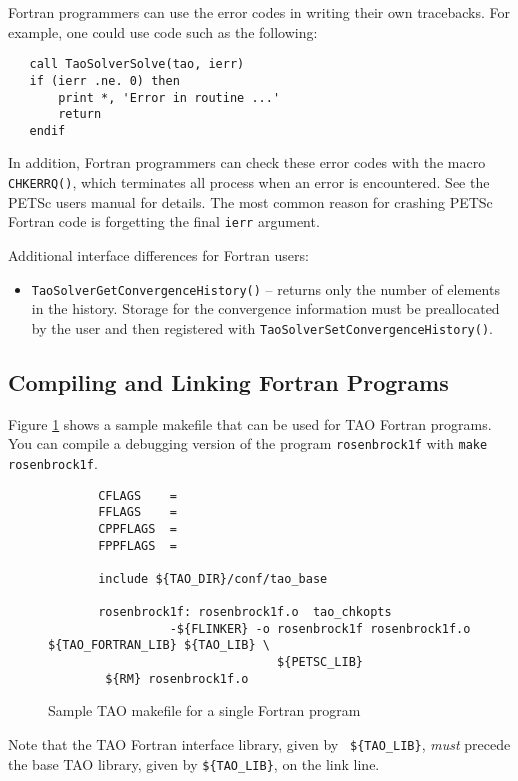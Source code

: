 Fortran programmers can use the error codes in writing their own
tracebacks.  For example, one could use code such as the following:
\begin{verbatim}
   call TaoSolverSolve(tao, ierr)
   if (ierr .ne. 0) then
       print *, 'Error in routine ...'
       return
   endif
\end{verbatim}
\noindent
In addition, Fortran programmers can check these error codes with the
macro {\tt CHKERRQ()}, which terminates all process when an error
is encountered.  See the PETSc users manual for details.  The most
common reason for crashing PETSc Fortran code is forgetting the final
{\tt ierr} argument.

Additional interface differences for Fortran users:
\begin{itemize}
\item \texttt{TaoSolverGetConvergenceHistory()} -- returns only the number of 
elements in the history.  Storage for the convergence information must 
be preallocated by the user and then registered with 
\texttt{TaoSolverSetConvergenceHistory()}.
\end{itemize}

\subsection{Compiling and Linking Fortran Programs}
\label{sec:fortcompile}

Figure \ref{fig:make4} shows a sample makefile that can be used for
TAO Fortran programs.  You can compile a debugging
version of the program {\tt rosenbrock1f} with 
{\tt make rosenbrock1f}.

\begin{figure}[tbh]
{\footnotesize
\begin{verbatim}   
       CFLAGS    = 
       FFLAGS    = 
       CPPFLAGS  =
       FPPFLAGS  =
       
       include ${TAO_DIR}/conf/tao_base
   
       rosenbrock1f: rosenbrock1f.o  tao_chkopts
                 -${FLINKER} -o rosenbrock1f rosenbrock1f.o ${TAO_FORTRAN_LIB} ${TAO_LIB} \
                                ${PETSC_LIB}
        ${RM} rosenbrock1f.o
\end{verbatim} %
\noindent
}
\caption{Sample TAO makefile for a single Fortran program}
\label{fig:make4}
\end{figure}

\noindent
Note that the TAO Fortran interface library, given by {\tt
\$\{TAO\_LIB\}}, {\em must}  precede
the base TAO library, given by {\tt \$\{TAO\_LIB\}}, 
on the link line.

